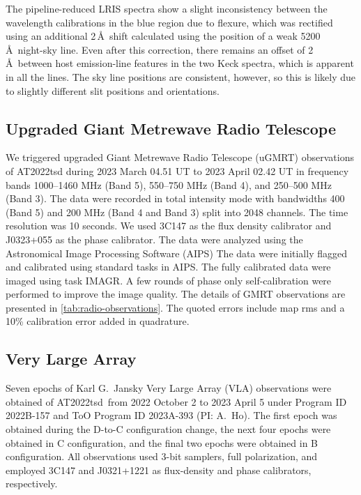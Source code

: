 \documentclass{nature_plusfigure}
\newcommand{\at}{AT2022tsd}
\begin{document}
\begin{methods}
The pipeline-reduced LRIS spectra show a slight inconsistency between the wavelength calibrations in the blue region due to flexure, which was rectified using an additional 2\,\AA\ shift calculated using the position of a weak 5200\,\AA\ night-sky line.
Even after this correction, there remains an offset of 2\,\AA\ between host emission-line features in the two Keck spectra, which is apparent in all the lines. The sky line positions are consistent, however, so this is likely due to slightly different slit positions and orientations. 


\subsection{Upgraded Giant Metrewave Radio Telescope}
\label{sec:GMRT}

We triggered upgraded Giant Metrewave Radio Telescope (uGMRT) observations of AT2022tsd
during 2023 March 04.51 UT to 2023 April 02.42 UT in frequency bands 1000--1460 MHz
(Band 5), 550--750 MHz (Band 4), and 250--500 MHz (Band 3). The data were recorded
in total intensity mode with bandwidths 400 (Band 5) and 200 MHz (Band 4 and Band 3)
split into 2048 channels. The time resolution was 10 seconds. We used 3C147 as the flux density
calibrator and J0323+055 as the phase calibrator.
The data were analyzed\cite{Nayana2017} using the Astronomical Image Processing Software (AIPS\cite{Greisen2003})
The data were initially flagged and calibrated using standard tasks in AIPS. The fully calibrated data were imaged
using task IMAGR. A few rounds of phase only self-calibration were performed to improve the
image quality. The details of GMRT observations are presented in \ref{tab:radio-observations}. The quoted errors
include map rms and a 10\% calibration error added in quadrature.

\subsection{Very Large Array}
\label{sec:VLA}

Seven epochs of Karl G.\ Jansky Very Large Array (VLA\cite{Perley2011}) observations were obtained of \at\ from 2022 October 2 to 2023 April 5 under Program ID 2022B-157 and ToO Program ID 2023A-393 (PI: A.\ Ho).
The first epoch was obtained during the D-to-C configuration change, the next four epochs were obtained in C configuration, and the final two epochs were obtained in B configuration.
All observations used 3-bit samplers, full polarization, and employed 3C147 and J0321+1221 as flux-density and phase calibrators, respectively.


\end{methods}
\end{document}
